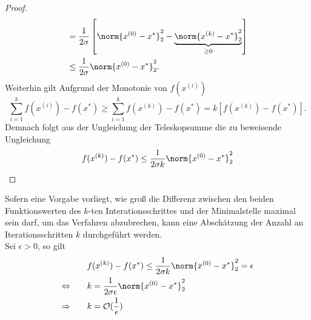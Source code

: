 \begin{proof}
\begin{gather*}
\begin{aligned}
                  & = \frac{1}{2\sigma} \left[ \norm{x^{(0)}-x^\ast}^2_2 - \underbrace{\norm{x^{(k)}-x^\ast}^2_2}_{\geq 0}\right] \\
                  & \leq \frac{1}{2\sigma} \norm{x^{(0)}-x^\ast}^2_2 \text{.}\\
          			\end{aligned}
        	\end{gather*}
        Weiterhin gilt Aufgrund der Monotonie von $f(x^{(i)})$
        \begin{equation*}
          \sum_{i=1}^k f(x^{(i)})-f(x^\ast) \geq \sum_{i=1}^k f(x^{(k)})-f(x^\ast) = k \left[ f(x^{(k)})-f(x^\ast) \right] \text{.}
        \end{equation*}
        Demnach folgt aus der Ungleichung der Teleskopsumme die zu beweisende Ungleichung
        \begin{equation*}
          f(x^{(k)})-f(x^\ast) \leq \frac{1}{2\sigma k} \norm{x^{(0)}-x^\ast}^2_2
        \end{equation*}
\end{proof}
\noindent
Sofern eine Vorgabe vorliegt, wie groß die Differenz zwischen den beiden Funktionswerten des $k$-ten Interationsschrittes und der Minimalstelle maximal sein darf, um das Verfahren abzubrechen, kann eine Abschätzung der Anzahl an Iterationsschritten $k$ durchgeführt werden. \\
Sei $\epsilon > 0$, so gilt
\begin{gather*}
        \begin{aligned}
          & f(x^{(k)})-f(x^\ast)  \leq \frac{1}{2\sigma k} \norm{x^{(0)}-x^\ast}^2_2  = \epsilon\\
          \Leftrightarrow \qquad & k  = \frac{1}{2\sigma \epsilon} \norm{x^{(0)}-x^\ast}^2_2 \\
          \Rightarrow \qquad & k = \mathcal{O}(\frac{1}{\epsilon})\\
        \end{aligned}
  \end{gather*}

